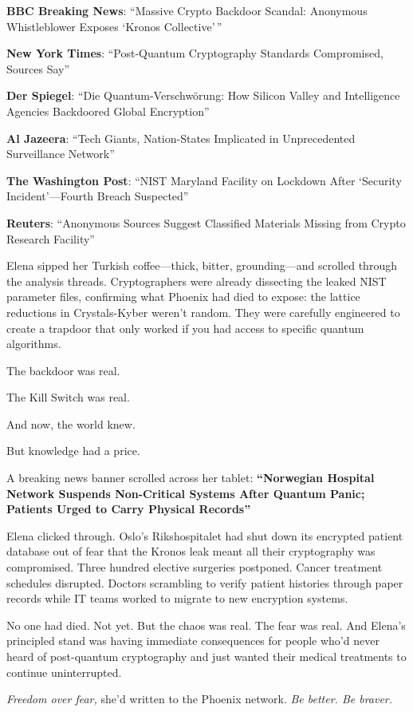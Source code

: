 \documentclass[12pt,letterpaper]{book}
\begin{document}
\textbf{BBC Breaking News}: ``Massive Crypto Backdoor Scandal: Anonymous Whistleblower Exposes `Kronos Collective'\,''

\textbf{New York Times}: ``Post-Quantum Cryptography Standards Compromised, Sources Say''

\textbf{Der Spiegel}: ``Die Quantum-Verschwörung: How Silicon Valley and Intelligence Agencies Backdoored Global Encryption''

\textbf{Al Jazeera}: ``Tech Giants, Nation-States Implicated in Unprecedented Surveillance Network''

\textbf{The Washington Post}: ``NIST Maryland Facility on Lockdown After `Security Incident'---Fourth Breach Suspected''

\textbf{Reuters}: ``Anonymous Sources Suggest Classified Materials Missing from Crypto Research Facility''

Elena sipped her Turkish coffee---thick, bitter, grounding---and scrolled through the analysis threads. Cryptographers were already dissecting the leaked NIST parameter files, confirming what Phoenix had died to expose: the lattice reductions in Crystals-Kyber weren't random. They were carefully engineered to create a trapdoor that only worked if you had access to specific quantum algorithms.

The backdoor was real.

The Kill Switch was real.

And now, the world knew.

But knowledge had a price.

A breaking news banner scrolled across her tablet: \textbf{``Norwegian Hospital Network Suspends Non-Critical Systems After Quantum Panic; Patients Urged to Carry Physical Records''}

Elena clicked through. Oslo's Rikshospitalet had shut down its encrypted patient database out of fear that the Kronos leak meant all their cryptography was compromised. Three hundred elective surgeries postponed. Cancer treatment schedules disrupted. Doctors scrambling to verify patient histories through paper records while IT teams worked to migrate to new encryption systems.

No one had died. Not yet. But the chaos was real. The fear was real. And Elena's principled stand was having immediate consequences for people who'd never heard of post-quantum cryptography and just wanted their medical treatments to continue uninterrupted.

\emph{Freedom over fear,} she'd written to the Phoenix network. \emph{Be better. Be braver.}
\end{document}
